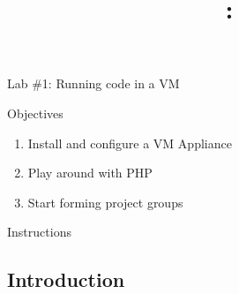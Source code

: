 \documentclass[letterpaper]{article}
\title{\course{}: \activity{}}
\date{}
\newcommand{\activity}{Lab \#1}
\newcommand{\horizrule}{\noindent\rule{\linewidth}{0.15mm}}
\begin{document}
\reversemarginpar

\begin{center}
  \Large{\activity{}: Running code in a VM}
\end{center}

\begin{center}
  \large{Objectives}

\begin{enumerate}
\item Install and configure a VM Appliance
\item Play around with PHP
\item Start forming project groups
\end{enumerate}
\end{center}


\begin{center}
  \large{Instructions}
\end{center}


\subsection*{Introduction}
\end{document}
